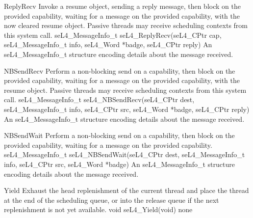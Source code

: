 {ReplyRecv}
{Invoke a resume object, sending a reply message, then block on the provided capability, waiting for
a message on the provided capability, with the now cleared resume object. Passive threads may receive
scheduling contexts from  this system call.}
{seL4\_MessageInfo\_t seL4\_ReplyRecv(seL4\_CPtr cap, seL4\_MessageInfo\_t info, seL4\_Word *badge,
seL4\_CPtr reply)}
{
}
{An seL4\_MessageInfo\_t structure encoding details about the message received.}

{NBSendRecv}
{Perform a non-blocking send on a capability, then block on the provided capability, waiting for
a message on the provided capability, with the resume object. Passive threads may receive
scheduling contexts from this system call.}
{seL4\_MessageInfo\_t seL4\_NBSendRecv(seL4\_CPtr dest, seL4\_MessageInfo\_t info, seL4\_CPtr src,
    seL4\_Word *badge, seL4\_CPtr reply)}
{
}
{An seL4\_MessageInfo\_t structure encoding details about the message received.}

{NBSendWait}
{Perform a non-blocking send on a capability, then block on the provided capability, waiting for
a message on the provided capability.}
{seL4\_MessageInfo\_t seL4\_NBSendWait(seL4\_CPtr dest, seL4\_MessageInfo\_t info, seL4\_CPtr src,
    seL4\_Word *badge)}
{
}
{An seL4\_MessageInfo\_t structure encoding details about the message received.}

{Yield}
{Exhaust the head replenishment of the current thread and place the thread at the end of the
scheduling queue, or into the release queue if the next replenishment is not yet available.}
{void seL4\_Yield(void)}
{}
{none}


